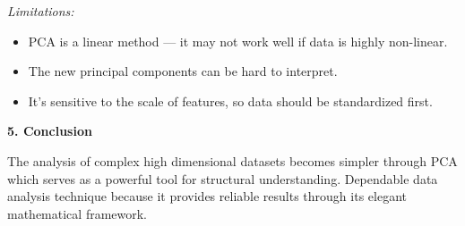 \documentclass[12pt,a4paper]{article}
\begin{document}
\textit{Limitations:}
\begin{itemize}
    \item PCA is a linear method — it may not work well if data is highly non-linear.
    \item The new principal components can be hard to interpret.
    \item It’s sensitive to the scale of features, so data should be standardized first.
\end{itemize}

\textbf{5. Conclusion}

The analysis of complex high dimensional datasets becomes simpler through PCA which serves as a powerful tool for structural understanding. Dependable data analysis technique because it provides reliable results through its elegant mathematical framework.
\end{document}
